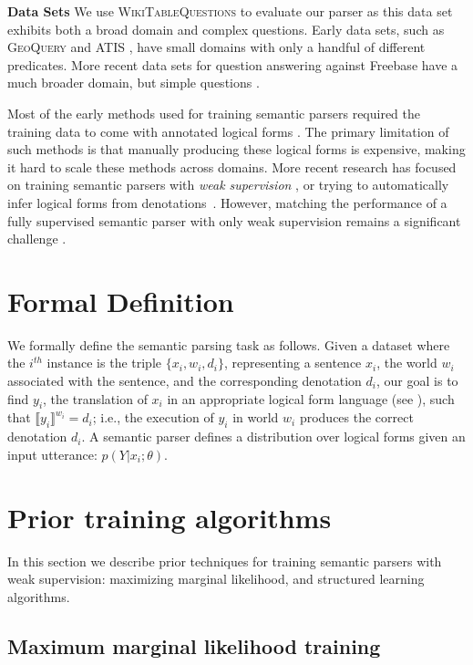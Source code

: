 \textbf{Data Sets} We use \textsc{WikiTableQuestions} to evaluate our parser as
this data set exhibits both a broad domain and complex questions.  Early data
sets, such as \textsc{GeoQuery} \cite{zelle1996} and \textsc{ATIS}
\cite{dahl1994}, have small domains with only a handful of different
predicates. More recent data sets for question answering against Freebase have
a much broader domain, but simple questions \cite{berant2013,cai2013}.

Most of the early methods used for training semantic parsers required the
training data to come with annotated logical forms
\cite{zelle1996learning,Zettlemoyer2005LearningTM}.  The primary limitation of
such methods is that manually producing these logical forms is expensive,
making it hard to scale these methods across domains. More recent research has
focused on training semantic parsers with \emph{weak supervision}
\cite{liang2011learning,berant2013semantic}, or trying to automatically infer
logical forms from denotations~\citep{pasupat2016inferring}. However, matching
the performance of a fully supervised semantic parser with only weak
supervision remains a significant challenge \cite{Yih2016TheVO}.

\section{Formal Definition} We formally define the semantic parsing task as
follows. Given a dataset where the $i^{th}$ instance is the triple $\{x_i, w_i,
d_i\}$, representing a sentence $x_i$, the world $w_i$ associated with the
sentence, and the corresponding denotation $d_i$, our goal is to find $y_i$,
the translation of $x_i$ in an appropriate logical form language (see
), such that $\llbracket y_i
\rrbracket^{w_i} = d_i$; i.e., the execution of $y_i$ in world $w_i$ produces
the correct denotation $d_i$.  A semantic parser defines a distribution over
logical forms given an input utterance: $p(Y|x_i; \theta)$.

\section{Prior training algorithms} \label{sec:prior_training}

In this section we describe prior techniques for training semantic parsers with
weak supervision: maximizing marginal likelihood, and structured learning
algorithms.

\subsection{Maximum marginal likelihood training} \label{sec:mml}

